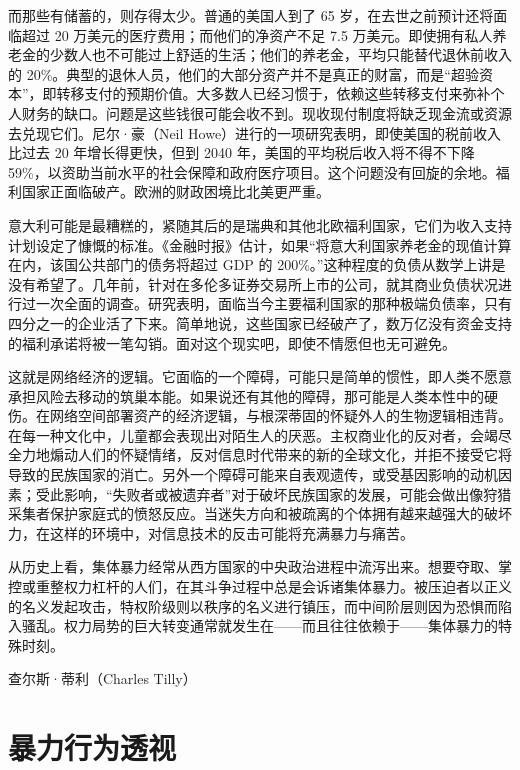 而那些有储蓄的，则存得太少。普通的美国人到了 65 岁，在去世之前预计还将面临超过 20 万美元的医疗费用；而他们的净资产不足 7.5 万美元。即使拥有私人养老金的少数人也不可能过上舒适的生活；他们的养老金，平均只能替代退休前收入的 20\%。典型的退休人员，他们的大部分资产并不是真正的财富，而是“超验资本”，即转移支付的预期价值。大多数人已经习惯于，依赖这些转移支付来弥补个人财务的缺口。问题是这些钱很可能会收不到。现收现付制度将缺乏现金流或资源去兑现它们。尼尔·豪（Neil Howe）进行的一项研究表明，即使美国的税前收入比过去 20 年增长得更快，但到 2040 年，美国的平均税后收入将不得不下降 59\%，以资助当前水平的社会保障和政府医疗项目。这个问题没有回旋的余地。福利国家正面临破产。欧洲的财政困境比北美更严重。

意大利可能是最糟糕的，紧随其后的是瑞典和其他北欧福利国家，它们为收入支持计划设定了慷慨的标准。《金融时报》估计，如果“将意大利国家养老金的现值计算在内，该国公共部门的债务将超过 GDP 的 200\%。”这种程度的负债从数学上讲是没有希望了。几年前，针对在多伦多证券交易所上市的公司，就其商业负债状况进行过一次全面的调查。研究表明，面临当今主要福利国家的那种极端负债率，只有四分之一的企业活了下来。简单地说，这些国家已经破产了，数万亿没有资金支持的福利承诺将被一笔勾销。面对这个现实吧，即使不情愿但也无可避免。

这就是网络经济的逻辑。它面临的一个障碍，可能只是简单的惯性，即人类不愿意承担风险去移动的筑巢本能。如果说还有其他的障碍，那可能是人类本性中的硬伤。在网络空间部署资产的经济逻辑，与根深蒂固的怀疑外人的生物逻辑相违背。在每一种文化中，儿童都会表现出对陌生人的厌恶。主权商业化的反对者，会竭尽全力地煽动人们的怀疑情绪，反对信息时代带来的新的全球文化，并拒不接受它将导致的民族国家的消亡。另外一个障碍可能来自表观遗传，或受基因影响的动机因素；受此影响，“失败者或被遗弃者”对于破坏民族国家的发展，可能会做出像狩猎采集者保护家庭式的愤怒反应。当迷失方向和被疏离的个体拥有越来越强大的破坏力，在这样的环境中，对信息技术的反击可能将充满暴力与痛苦。

\begin{tcolorbox}
\kaishu 从历史上看，集体暴力经常从西方国家的中央政治进程中流泻出来。想要夺取、掌控或重整权力杠杆的人们，在其斗争过程中总是会诉诸集体暴力。被压迫者以正义的名义发起攻击，特权阶级则以秩序的名义进行镇压，而中间阶层则因为恐惧而陷入骚乱。权力局势的巨大转变通常就发生在——而且往往依赖于——集体暴力的特殊时刻。
\begin{flushright}
查尔斯·蒂利（Charles Tilly）
\end{flushright}
\end{tcolorbox}


\section{暴力行为透视}

